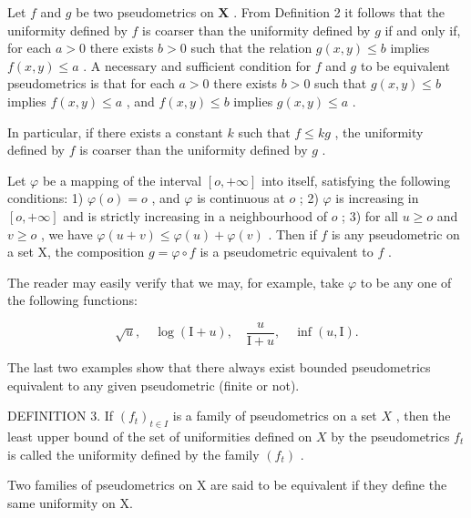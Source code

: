 Let \(f\) and \(g\) be two pseudometrics on \(\mathbf{X}\) . From Definition 2 it follows that the uniformity defined by \(f\) is coarser than the uniformity defined by \(g\) if and only if, for each \(a > 0\) there exists \(b > 0\) such that the relation \(g(x, y) \leqslant b\) implies \(f(x, y) \leqslant a\) . A necessary and sufficient condition for \(f\) and \(g\) to be equivalent pseudometrics is that for each \(a > 0\) there exists \(b > 0\) such that \(g(x, y) \leqslant b\) implies \(f(x, y) \leqslant a\) , and \(f(x, y) \leqslant b\) implies \(g(x, y) \leqslant a\) .

In particular, if there exists a constant \(k\) such that \(f \leqslant kg\) , the uniformity defined by \(f\) is coarser than the uniformity defined by \(g\) .

Let \(\varphi\) be a mapping of the interval \([o, +\infty]\) into itself, satisfying the following conditions: 1) \(\varphi(o) = o\) , and \(\varphi\) is continuous at \(o\) ; 2) \(\varphi\) is increasing in \([o, +\infty]\) and is strictly increasing in a neighbourhood of \(o\) ; 3) for all \(u \geqslant o\) and \(v \geqslant o\) , we have \(\varphi(u + v) \leqslant \varphi(u) + \varphi(v)\) . Then if \(f\) is any pseudometric on a set X, the composition \(g = \varphi \circ f\) is a pseudometric equivalent to \(f\) .

The reader may easily verify that we may, for example, take \(\varphi\) to be any one of the following functions:

\[
\sqrt {u}, \quad \log (\mathrm{I} + u), \quad \frac {u}{\mathrm{I} + u}, \quad \inf (u, \mathrm{I}).
\]

The last two examples show that there always exist bounded pseudometrics equivalent to any given pseudometric (finite or not).

DEFINITION 3. If \((f_{t})_{t\in I}\) is a family of pseudometrics on a set \(X\) , then the least upper bound of the set of uniformities defined on \(X\) by the pseudometrics \(f_{t}\) is called the uniformity defined by the family \((f_{t})\) .

Two families of pseudometrics on X are said to be equivalent if they define the same uniformity on X.

